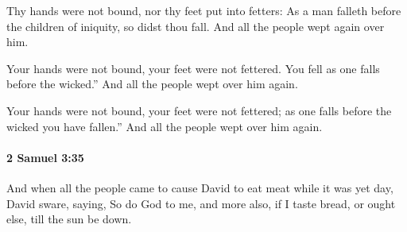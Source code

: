 			\begin{versebox}
					\item[BHS] 
					\item[ASV] Thy hands were not bound, nor thy feet put into fetters: As a man falleth before the children of iniquity, so didst thou fall. And all the people wept again over him.
					\item[NIV] Your hands were not bound, your feet were not fettered. You fell as one falls before the wicked.” And all the people wept over him again.
					\item[NRSV] Your hands were not bound, your feet were not fettered; as one falls before the wicked you have fallen.” And all the people wept over him again.
			\end{versebox}

		\paragraph{2 Samuel 3:35} %
			\label{2SAMUEL-3-35}

			And when all the people came to cause David to eat meat while it was yet day, David sware, saying, So do God to me, and more also, if I taste bread, or ought else, till the sun be down.

